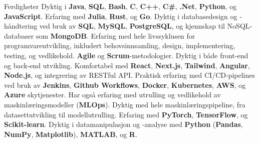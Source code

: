 \begin{rubric}{Ferdigheter}
\entry*[Programmeringsspråk]
    Dyktig i \textbf{Java}, \textbf{SQL}, \textbf{Bash}, \textbf{C}, \textbf{C++}, \textbf{C\#}, \textbf{.Net}, \textbf{Python}, og \textbf{JavaScript}. Erfaring med \textbf{Julia}, \textbf{Rust}, og \textbf{Go}.
    Dyktig i databasedesign og -håndtering ved bruk av \textbf{SQL}, \textbf{MySQL}, \textbf{PostgreSQL}, og kjennskap til NoSQL-databaser som \textbf{MongoDB}.
    Erfaring med hele livssyklusen for programvareutvikling, inkludert behovsinnsamling, design, implementering, testing, og vedlikehold. \textbf{Agile} og \textbf{Scrum}-metodologier.
\entry*[Webutvikling]
    Dyktig i både front-end og back-end utvikling. Komfortabel med \textbf{React}, \textbf{Next.js}, \textbf{Tailwind}, \textbf{Angular}, \textbf{Node.js}, og integrering av RESTful API.
    Praktisk erfaring med CI/CD-pipelines ved bruk av \textbf{Jenkins}, \textbf{Github Workflows}, \textbf{Docker}, \textbf{Kubernetes}, \textbf{AWS}, og \textbf{Azure} skytjenester. Har også erfaring med utrulling og vedlikehold av maskinlæringsmodeller (\textbf{MLOps}).
\entry*[Maskinlæring]
    Dyktig med hele maskinlæringspipeline, fra datasettutvikling til modellutrulling. Erfaring med \textbf{PyTorch}, \textbf{TensorFlow}, og \textbf{Scikit-learn}.
\entry*[Dataanalyse]
    Dyktig i datamanipulasjon og -analyse med \textbf{Python} (\textbf{Pandas}, \textbf{NumPy}, \textbf{Matplotlib}), \textbf{MATLAB}, og \textbf{R}.
\end{rubric}
